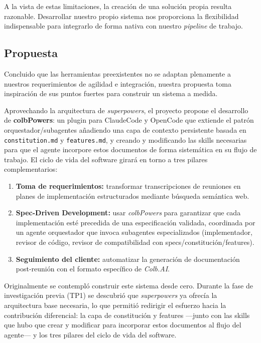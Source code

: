 \documentclass[11pt, letterpaper]{article}
\begin{document}
A la vista de estas limitaciones, la creación de una solución propia resulta razonable. Desarrollar nuestro propio sistema nos proporciona la flexibilidad indispensable para integrarlo de forma nativa con nuestro \textit{pipeline} de trabajo.

\newpage

\subsection{Propuesta}
\label{sec:propuesta_implementacion}

Concluido que las herramientas preexistentes no se adaptan plenamente a nuestros requerimientos de agilidad e integración, nuestra propuesta toma inspiración de sus puntos fuertes para construir un sistema a medida.

Aprovechando la arquitectura de \textit{superpowers}, el proyecto propone el desarrollo de \textbf{colbPowers}: un plugin para ClaudeCode y OpenCode que extiende el patrón orquestador/subagentes añadiendo una capa de contexto persistente basada en \texttt{constitution.md} y \texttt{features.md}, y creando y modificando las skills necesarias para que el agente incorpore estos documentos de forma sistemática en su flujo de trabajo. El ciclo de vida del software girará en torno a tres pilares complementarios:

\begin{enumerate}
    \item \textbf{Toma de requerimientos:} transformar transcripciones de reuniones en planes de implementación estructurados mediante búsqueda semántica web.
    \item \textbf{Spec-Driven Development:} usar \textit{colbPowers} para garantizar que cada implementación esté precedida de una especificación validada, coordinada por un agente orquestador que invoca subagentes especializados (implementador, revisor de código, revisor de compatibilidad con specs/constitución/features). 
    \item \textbf{Seguimiento del cliente:} automatizar la generación de documentación post-reunión con el formato específico de \textit{Colb.AI}.
\end{enumerate}

Originalmente se contempló construir este sistema desde cero. Durante la fase de investigación previa (TP1) se descubrió que \textit{superpowers} ya ofrecía la arquitectura base necesaria, lo que permitió redirigir el esfuerzo hacia la contribución diferencial: la capa de constitución y features ---junto con las skills que hubo que crear y modificar para incorporar estos documentos al flujo del agente--- y los tres pilares del ciclo de vida del software.
\end{document}
